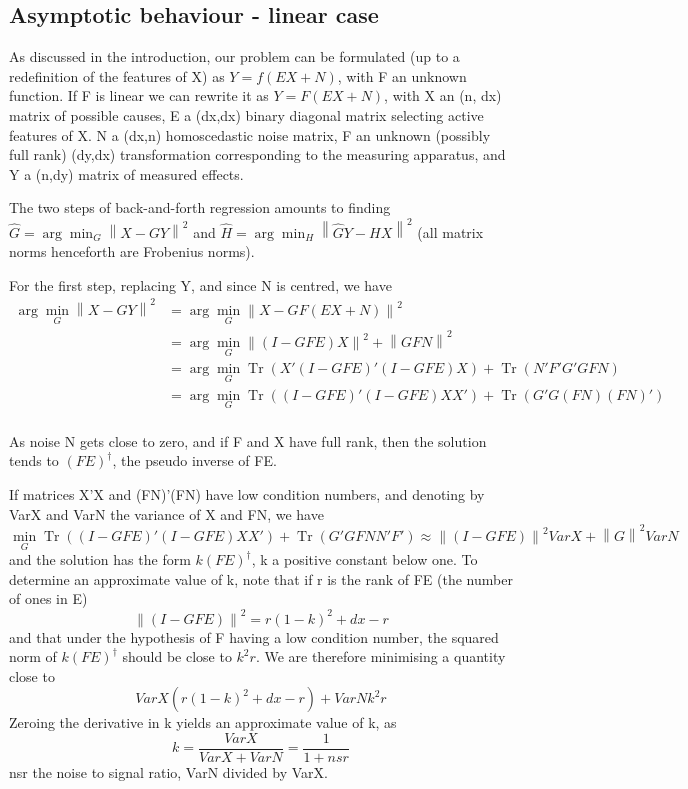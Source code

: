 \documentclass{article}
\DeclareMathOperator{\Tr}{Tr}
\begin{document}
\subsection{Asymptotic behaviour - linear case}
As discussed in the introduction, our problem can be formulated (up to a redefinition of the features of X) as $Y=f(EX+N)$, with F an unknown function.
%
If F is linear we can rewrite it as $Y = F(EX + N)$, with X an (n, dx) matrix of possible causes, E a (dx,dx) binary diagonal matrix selecting active features of X.
%
N a (dx,n) homoscedastic noise matrix, F an unknown (possibly full rank) (dy,dx) transformation corresponding to the measuring apparatus, and Y a (n,dy) matrix of measured effects.

The two steps of back-and-forth regression amounts to finding $\hat G=\arg \min_G \left \| X-GY \right \|^2$ and $\hat H =\arg \min_H \left \| \hat GY - HX \right \|^2$ (all matrix norms henceforth are Frobenius norms).

For the first step, replacing Y, and since N is centred, we have
\begin{equation}
\begin{aligned}
\arg \min_G \left \| X-GY \right \|^2 &= \arg \min_G \left \| X - GF(EX+N)\right\|^2 \\
&{}= \arg \min_G \left \| (I-GFE)X\right\| ^2  + \left \| GFN\right \| ^2\\
&{}= \arg \min_G \Tr (X'(I-GFE)'(I-GFE)X) + \Tr (N'F'G'GFN)\\
&{}= \arg \min_G \Tr ((I-GFE)'(I-GFE)XX') + \Tr (G'G(FN)(FN)')\\
\end{aligned}
\end{equation}

As noise N gets close to zero, and if F and X have full rank, then the solution tends to $(FE)^\dagger$, the pseudo inverse of FE.

If matrices X'X and (FN)'(FN) have low condition numbers, and denoting by VarX and VarN the variance of X and FN, we have $$\min_G \Tr ((I-GFE)'(I-GFE)XX') + \Tr (G'GFNN'F') \approx \left \| (I-GFE)\right\| ^2 VarX  + \left \| G\right \| ^2 VarN$$and the solution has the form $k(FE)^\dagger$, k a positive constant below one. To determine an approximate value of k, note that if r is the rank of FE (the number of ones in E) $$\left \| (I-GFE)\right\| ^2 = r (1-k)^2 + dx - r$$ and that under the hypothesis of F having a low condition number, the squared norm of $k(FE)^\dagger$ should be close to $k^2r$. We are therefore minimising a quantity close to $$ VarX (r (1-k)^2 + dx - r) + VarN k^2 r$$ Zeroing the derivative in k yields an approximate value of k, as $$k= \frac {VarX}{VarX + VarN}=\frac{1}{1+nsr}$$ nsr the noise to signal ratio, VarN divided by VarX.
\end{document}
